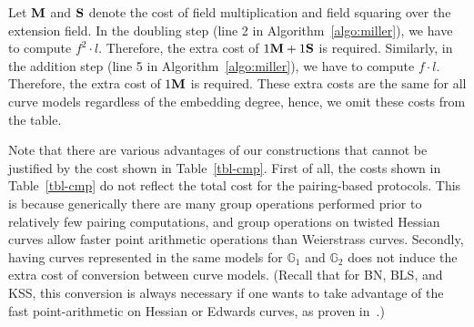 Let $\textbf{M}$ and $\textbf{S}$ denote the cost of field multiplication and field squaring over the extension field.
In the doubling step (line 2 in Algorithm~\ref{algo:miller}),
we have to compute $f^2 \cdot l$.
Therefore, the extra cost of $1\textbf{M} + 1\textbf{S}$ is required.
Similarly, in the addition step (line 5 in Algorithm~\ref{algo:miller}),
we have to compute $f \cdot l$.
Therefore, the extra cost of $1\textbf{M}$ is required.
These extra costs are the same for all curve models regardless of the embedding degree, hence, we omit these costs from the table.

Note that there are various advantages of our constructions that cannot be justified by the cost shown in Table~\ref{tbl-cmp}.
First of all, the costs shown in Table~\ref{tbl-cmp} do not reflect the total cost for the pairing-based protocols.
This is because generically there are many group operations performed prior to relatively few pairing computations, and group operations on twisted Hessian curves allow faster point arithmetic operations than Weierstrass curves.
Secondly, having curves represented in the same models for $\mathbb{G}_1$ and $\mathbb{G}_2$ does not induce the extra cost of conversion between curve models. (Recall that for BN, BLS, and KSS, this conversion is always necessary if one wants to take advantage of the fast point-arithmetic on Hessian or Edwards curves, as proven in~\cite{2013/bos-pairing}.)


